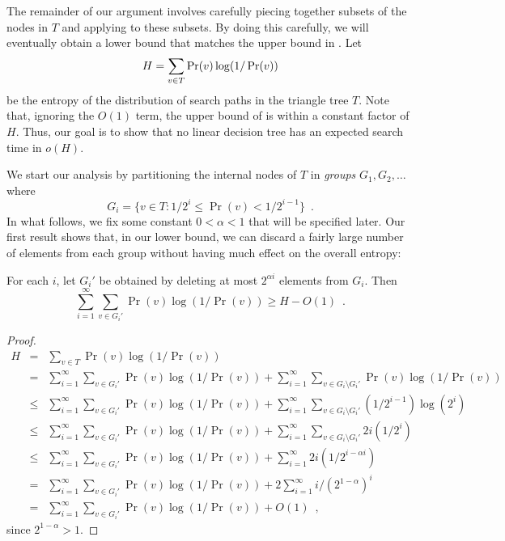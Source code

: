 \documentclass[charterfonts,lotsofwhite]{patmorin}
\begin{document}
The remainder of our argument involves carefully piecing together
subsets of the nodes in $T$ and applying 
 to these subsets.  By doing this carefully, we
will eventually obtain a lower bound that matches the upper bound
in .  Let 
\begin{equation}
   H = \sum_{v\in T} \Pr(v)\log (1/\Pr(v)) \eqlabel{H}
\end{equation}
be the entropy of the distribution of search paths in the triangle
tree $T$.  Note that,
ignoring the $O(1)$ term,
the upper bound of  is within a constant factor of
$H$. Thus, our goal is to show that no linear decision tree has an
expected search time in $o(H)$.

We start our analysis by partitioning the internal nodes of $T$ in
\emph{groups} $G_1,G_2,\ldots$ where
\[
	G_i = \{v\in T : 1/2^{i} \le \Pr(v) < 1/2^{i-1} \} \enspace .
\]
In what follows, we fix some constant $0< \alpha < 1$ that will be
specified later.  Our first
result shows that, in our lower bound, we can discard a fairly large
number of elements from each group without having much effect on the
overall entropy:

\begin{lem}
For each $i$, let $G_i'$ be obtained by deleting at most $2^{\alpha
i}$ elements from $G_i$.  Then
\[
    \sum_{i=1}^\infty \sum_{v\in G_i'} \Pr(v)\log(1/\Pr(v)) \ge H-O(1)
	\enspace .
\]
\end{lem}

\begin{proof}
\begin{eqnarray*}
   H & = & \sum_{v\in T} \Pr(v)\log(1/\Pr(v)) \\
   & = & \sum_{i=1}^{\infty}\sum_{v\in G_i'} \Pr(v)\log (1/\Pr(v)) +
         \sum_{i=1}^{\infty}\sum_{v\in G_i\setminus G_i'} \Pr(v)\log (1/\Pr(v)) \\
   & \le & \sum_{i=1}^{\infty}\sum_{v\in G_i'} \Pr(v)\log (1/\Pr(v)) +
         \sum_{i=1}^{\infty}\sum_{v\in G_i\setminus G_i'} (1/2^{i-1})\log (2^i) \\
   & \le & \sum_{i=1}^{\infty}\sum_{v\in G_i'} \Pr(v)\log (1/\Pr(v)) +
         \sum_{i=1}^{\infty}\sum_{v\in G_i\setminus G_i'} 2i(1/2^{i}) \\
   & \le & \sum_{i=1}^{\infty}\sum_{v\in G_i'} \Pr(v)\log (1/\Pr(v)) +
         \sum_{i=1}^{\infty} 2i(1/2^{i-\alpha i}) \\
   & = & \sum_{i=1}^{\infty}\sum_{v\in G_i'} \Pr(v)\log (1/\Pr(v)) +
         2\sum_{i=1}^{\infty} i/(2^{1-\alpha})^{i} \\
   & = & \sum_{i=1}^{\infty}\sum_{v\in G_i'} \Pr(v)\log (1/\Pr(v)) + O(1)
	\enspace ,
\end{eqnarray*}
since $2^{1-\alpha} > 1$.
\end{proof}
\end{document}
